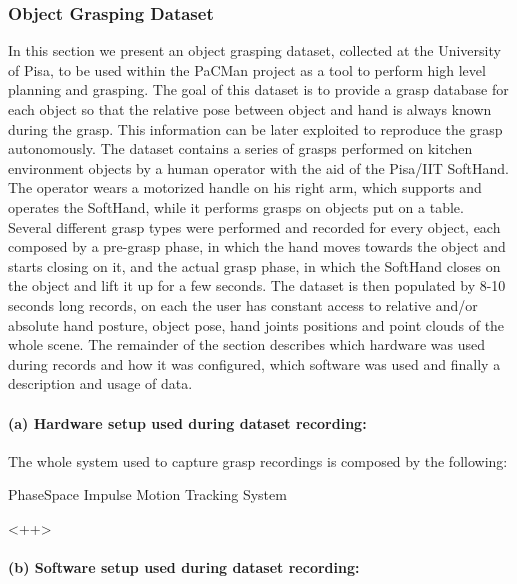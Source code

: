 
\subsubsection{Object Grasping Dataset}
\label{sec:ObjectGraspingDataset}

In this section we present an object grasping dataset, collected at the University of Pisa, to be used within the PaCMan project as a tool to perform high level planning and grasping.
The goal of this dataset is to provide a grasp database for each object so that the relative pose between object and hand is always known during the grasp. This information can be later 
exploited to reproduce the grasp autonomously. 
The dataset contains a series of grasps performed on kitchen environment objects by a human operator with the aid of the Pisa/IIT SoftHand. The operator wears
a motorized handle on his right arm, which supports and operates the SoftHand, while it performs grasps on objects put on a table. Several different grasp types were performed and recorded for every object, each composed by
a pre-grasp phase, in which the hand moves towards the object and starts closing on it, and the actual grasp phase, in which the SoftHand closes on the object and lift it up for a few seconds.
The dataset is then populated by 8-10 seconds long records, on each the user has constant access to relative and/or absolute hand posture, object pose, hand joints positions 
and point clouds of the whole scene. The remainder of the section describes which hardware was used during records and how it was configured, which software was used and finally a description and usage of data.%

\paragraph{(a) Hardware setup used during dataset recording:}
The whole system used to capture grasp recordings is composed by the following:
\begin{description}
  \item[PhaseSpace Impulse Motion Tracking System] %
\end{description}<++>
\paragraph{(b) Software setup used during dataset recording:}
